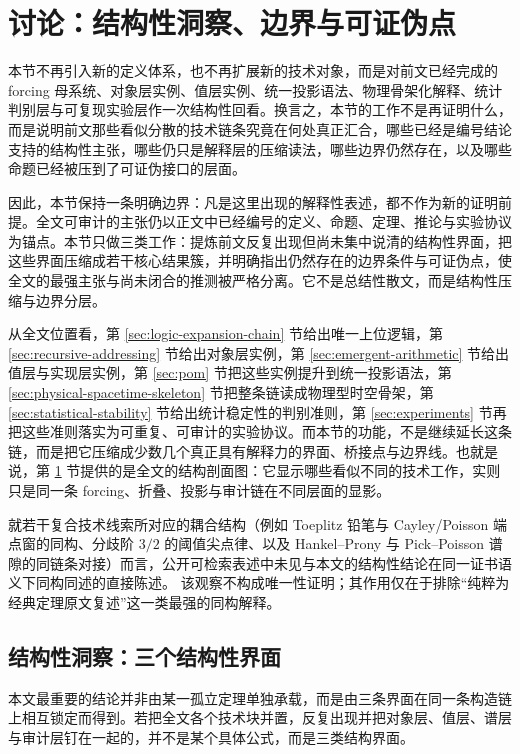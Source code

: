 \section{讨论：结构性洞察、边界与可证伪点}\label{sec:discussion}

本节不再引入新的定义体系，也不再扩展新的技术对象，而是对前文已经完成的 forcing 母系统、对象层实例、值层实例、统一投影语法、物理骨架化解释、统计判别层与可复现实验层作一次结构性回看。换言之，本节的工作不是再证明什么，而是说明前文那些看似分散的技术链条究竟在何处真正汇合，哪些已经是编号结论支持的结构性主张，哪些仍只是解释层的压缩读法，哪些边界仍然存在，以及哪些命题已经被压到了可证伪接口的层面。

因此，本节保持一条明确边界：凡是这里出现的解释性表述，都不作为新的证明前提。全文可审计的主张仍以正文中已经编号的定义、命题、定理、推论与实验协议为锚点。本节只做三类工作：提炼前文反复出现但尚未集中说清的结构性界面，把这些界面压缩成若干核心结果簇，并明确指出仍然存在的边界条件与可证伪点，使全文的最强主张与尚未闭合的推测被严格分离。它不是总结性散文，而是结构性压缩与边界分层。

从全文位置看，第 \ref{sec:logic-expansion-chain} 节给出唯一上位逻辑，第 \ref{sec:recursive-addressing} 节给出对象层实例，第 \ref{sec:emergent-arithmetic} 节给出值层与实现层实例，第 \ref{sec:pom} 节把这些实例提升到统一投影语法，第 \ref{sec:physical-spacetime-skeleton} 节把整条链读成物理型时空骨架，第 \ref{sec:statistical-stability} 节给出统计稳定性的判别准则，第 \ref{sec:experiments} 节再把这些准则落实为可重复、可审计的实验协议。而本节的功能，不是继续延长这条链，而是把它压缩成少数几个真正具有解释力的界面、桥接点与边界线。也就是说，第 \ref{sec:discussion} 节提供的是全文的结构剖面图：它显示哪些看似不同的技术工作，实则只是同一条 forcing、折叠、投影与审计链在不同层面的显影。

\begin{remark}\label{rem:discussion-nonduplicate-structural-phrases}
就若干复合技术线索所对应的耦合结构（例如 Toeplitz 铅笔与 Cayley/Poisson 端点窗的同构、分歧阶 \(3/2\) 的阈值尖点律、以及 Hankel--Prony 与 Pick--Poisson 谱隙的同链条对接）而言，公开可检索表述中未见与本文的结构性结论在同一证书语义下同构同述的直接陈述。
该观察不构成唯一性证明；其作用仅在于排除“纯粹为经典定理原文复述”这一类最强的同构解释。
\end{remark}

\subsection{结构性洞察：三个结构性界面}\label{subsec:structural-insights}
本文最重要的结论并非由某一孤立定理单独承载，而是由三条界面在同一条构造链上相互锁定而得到。若把全文各个技术块并置，反复出现并把对象层、值层、谱层与审计层钉在一起的，并不是某个具体公式，而是三类结构界面。

